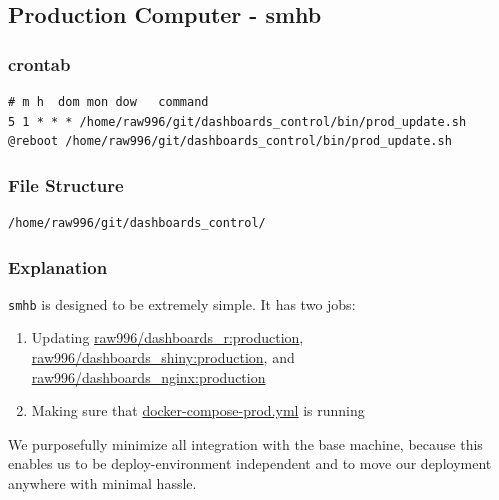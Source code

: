 \documentclass[12pt,]{article}
\providecommand{\tightlist}{%
  \setlength{\itemsep}{0pt}\setlength{\parskip}{0pt}}
\begin{document}
\subsection{Production Computer -
smhb}\label{production-computer---smhb}

\subsubsection{crontab}\label{crontab}

\begin{verbatim}
# m h  dom mon dow   command
5 1 * * * /home/raw996/git/dashboards_control/bin/prod_update.sh
@reboot /home/raw996/git/dashboards_control/bin/prod_update.sh
\end{verbatim}

\subsubsection{File Structure}\label{file-structure}

\begin{verbatim}
/home/raw996/git/dashboards_control/
\end{verbatim}

\subsubsection{Explanation}\label{explanation}

\texttt{smhb} is designed to be extremely simple. It has two jobs:

\begin{enumerate}
\def\labelenumi{\arabic{enumi}.}
\tightlist
\item
  Updating
  \href{https://hub.docker.com/r/raw996/dashboards_r/}{raw996/dashboards\_r:production},
  \href{https://hub.docker.com/r/raw996/dashboards_shiny/}{raw996/dashboards\_shiny:production},
  and
  \href{https://hub.docker.com/r/raw996/dashboards_nginx/}{raw996/dashboards\_nginx:production}
\item
  Making sure that
  \href{https://github.com/raubreywhite/dashboards_control/blob/master/infrastructure/docker-compose-prod.yml}{docker-compose-prod.yml}
  is running
\end{enumerate}

We purposefully minimize all integration with the base machine, because
this enables us to be deploy-environment independent and to move our
deployment anywhere with minimal hassle.
\end{document}
